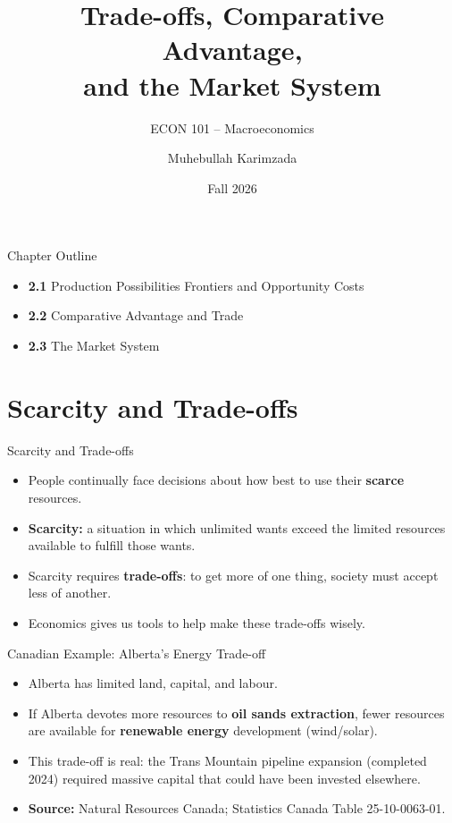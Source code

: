 \documentclass[aspectratio=169]{beamer}
\title{\textbf{Trade-offs, Comparative Advantage,\\ and the Market System}}
\subtitle{{\large ECON 101 -- Macroeconomics}}
\author{Muhebullah Karimzada}
\date{Fall 2026}
\begin{document}

\begin{frame}[plain]
  \titlepage
\end{frame}

\begin{frame}{Chapter Outline}
\transfade
\begin{itemize}[<+->]
  \item \textbf{2.1} Production Possibilities Frontiers and Opportunity Costs
  \item \textbf{2.2} Comparative Advantage and Trade
  \item \textbf{2.3} The Market System
\end{itemize}
\end{frame}

\section{Scarcity and Trade-offs}

\begin{frame}{Scarcity and Trade-offs}
\transfade
\begin{itemize}[<+->]
  \item People continually face decisions about how best to use their \textbf{scarce} resources.
  \item \textbf{Scarcity:} a situation in which unlimited wants exceed the limited resources available to fulfill those wants.
  \item Scarcity requires \textbf{trade-offs}: to get more of one thing, society must accept less of another.
  \item Economics gives us tools to help make these trade-offs wisely.
\end{itemize}
\end{frame}

\begin{frame}{Canadian Example: Alberta's Energy Trade-off}
\transfade
\begin{itemize}[<+->]
  \item Alberta has limited land, capital, and labour.
  \item If Alberta devotes more resources to \textbf{oil sands extraction}, fewer resources are available for \textbf{renewable energy} development (wind/solar).
  \item This trade-off is real: the Trans Mountain pipeline expansion (completed 2024) required massive capital that could have been invested elsewhere.
  \item \textbf{Source:} Natural Resources Canada; Statistics Canada Table 25-10-0063-01.
\end{itemize}
\end{frame}
\end{document}
